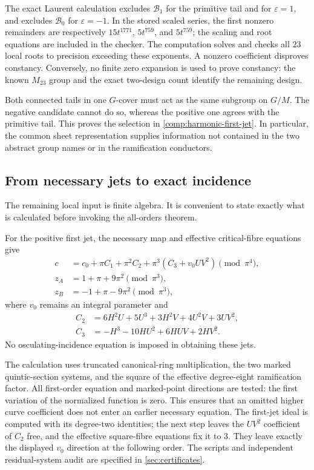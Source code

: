 The exact Laurent calculation excludes $\mathcal B_1$ for the
primitive tail and for $\varepsilon=1$, and excludes
$\mathcal B_0$ for $\varepsilon=-1$.  In the stored scaled series,
the first nonzero remainders are respectively $15t^{1771}$,
$5t^{759}$, and $5t^{759}$; the scaling and root equations are
included in the checker.  The computation solves and checks all
$23$ local roots to precision exceeding these exponents.
A nonzero coefficient disproves constancy.  Conversely, no finite
zero expansion is used to prove constancy: the known $M_{23}$ group
and the exact two-design count identify the remaining design.

Both connected tails in one $G$-cover must act as the same subgroup
on $G/M$.  The negative candidate cannot do so, whereas the positive
one agrees with the primitive tail.  This proves the selection in
\cref{comp:harmonic-first-jet}.  In particular, the common sheet
representation supplies information not contained in the two
abstract group names or in the ramification conductors.

\subsection{From necessary jets to exact incidence}

The remaining local input is finite algebra.  It is convenient to
state exactly what is calculated before invoking the all-orders
theorem.

\begin{computation}
\label{comp:harmonic-required-jets}
For the positive first jet, the necessary map and effective
critical-fibre equations give
\[
 \begin{aligned}
 c&=c_0+\pi C_1+\pi^2C_2+\pi^3(C_3+v_0UV^2)\pmod{\pi^4},\\
 z_A&=1+\pi+9\pi^2\pmod{\pi^3},\\
 z_B&=-1+\pi-9\pi^2\pmod{\pi^3},
 \end{aligned}
\]
where $v_0$ remains an integral parameter and
\[
 \begin{aligned}
 C_2&=6H^2U+5U^3+3H^2V+4U^2V+3UV^2,\\
 C_3&=-H^3-10HU^2+6HUV+2HV^2.
 \end{aligned}
\]
No osculating-incidence equation is imposed in obtaining these jets.
\end{computation}

The calculation uses truncated canonical-ring multiplication, the
two marked quintic-section systems, and the square of the effective
degree-eight ramification factor.  All first-order equation and
marked-point directions are tested: the first variation of the
normalized function is zero.  This ensures that an omitted higher
curve coefficient does not enter an earlier necessary equation.
The first-jet ideal is computed with its degree-two identities;
the next step leaves the $UV^2$ coefficient of $C_2$ free, and the
effective square-fibre equations fix it to $3$.  They leave exactly
the displayed $v_0$ direction at the following order.
The scripts and independent residual-system audit are specified in
\cref{sec:certificates}.

